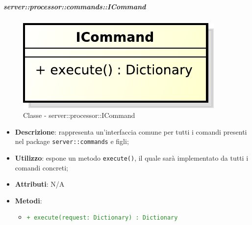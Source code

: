       \subparagraph{server::processor::commands::ICommand} %
      \label{subp:bdsm_app_server_processor_commands_icommand}
	    \begin{figure}[!htbp]
 	 		\centering
 			\centerline{\includegraphics[scale=0.75]{./images/server/classes/processor/i_command.pdf}}
 			\caption{Classe - server::processor::ICommand}
		\end{figure}
      \begin{itemize}
        \item \textbf{Descrizione}: rappresenta un'interfaccia comune per tutti i comandi presenti nel package \texttt{server::commands} e figli;
        \item \textbf{Utilizzo}: espone un metodo \texttt{execute()}, il quale sarà implementato da tutti i comandi concreti;
    \item \textbf{Attributi}: N/A
    \item \textbf{Metodi}:
          \begin{itemize}
              \item \textcolor{forestgreen}{\texttt{+ execute(request: Dictionary) : Dictionary}}
          \end{itemize}
      \end{itemize}


